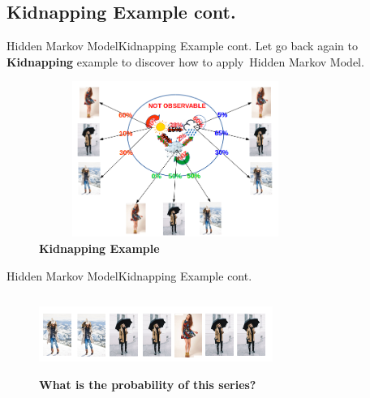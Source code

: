 \documentclass[10pt]{beamer}
\begin{document}
\subsection{Kidnapping Example cont.}
\begin{frame}{Hidden Markov Model}{Kidnapping Example cont.}
    Let go back again to \textbf{Kidnapping} example to discover how to apply\ 
    Hidden Markov Model.
  \begin{figure}[h]
    \centering
    \includegraphics[width=3.5in,height=2in]{figures/kidnapping_example_model.png}
    \caption {\textbf{Kidnapping Example}}
  \end{figure}
\end{frame}

\begin{frame}{Hidden Markov Model}{Kidnapping Example cont.}
  \begin{figure}[h]
    \centering
    \includegraphics[width=3in,height=1in]{figures/kidnapping_example_02.png}
    \caption {\textbf{What is the probability of this series?}}
  \end{figure}
\end{frame}
\end{document}
